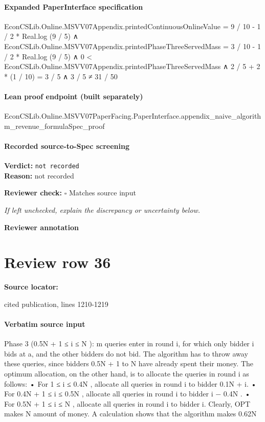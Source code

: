 \documentclass[10pt]{article}
\newcommand{\reviewerbox}{%
  \par\noindent\fbox{\parbox{0.96\linewidth}{\rule{0pt}{0.38in}}}\par
}
\newcommand{\reviewmatch}[1]{%
  \par\noindent\textbf{Reviewer check:} $\square$\; #1\par
  \noindent\emph{If left unchecked, explain the discrepancy or uncertainty below.}\par
}
\begin{document}
\paragraph{Expanded PaperInterface specification}
\begin{ReviewVerbatim}
EconCSLib.Online.MSVV07Appendix.printedContinuousOnlineValue = 9 / 10 - 1 / 2 * Real.log (9 / 5) ∧
  EconCSLib.Online.MSVV07Appendix.printedPhaseThreeServedMass = 3 / 10 - 1 / 2 * Real.log (9 / 5) ∧
    0 < EconCSLib.Online.MSVV07Appendix.printedPhaseThreeServedMass ∧ 2 / 5 + 2 * (1 / 10) = 3 / 5 ∧ 3 / 5 ≠ 31 / 50
\end{ReviewVerbatim}

\paragraph{Lean proof endpoint (built separately)}\begin{ReviewVerbatim}
EconCSLib.Online.MSVV07PaperFacing.PaperInterface.appendix_naive_algorithm_revenue_formulaSpec_proof
\end{ReviewVerbatim}

\paragraph{Recorded source-to-Spec screening}
\textbf{Verdict:} \texttt{not recorded}
\\
\textbf{Reason:} not recorded
\reviewmatch{Matches source input}
\noindent\textbf{Reviewer annotation}\par
\reviewerbox
\clearpage
\hypertarget{source-claim-e47cbf2a2f0be718}{}
\section*{Review row 36}
\textbf{Source locator:} {\footnotesize\raggedright cited publication, lines 1210-\allowbreak{}1219\par}
\paragraph{Verbatim source input}
\begin{ReviewVerbatim}
Phase 3 (0.5N + 1 ≤ i ≤ N ): m queries enter in round i, for which only bidder i bids at a,
and the other bidders do not bid.
The algorithm has to throw away these queries, since bidders 0.5N + 1 to N have already spent
their money.
The optimum allocation, on the other hand, is to allocate the queries in round i as follows:
• For 1 ≤ i ≤ 0.4N , allocate all queries in round i to bidder 0.1N + i.
• For 0.4N + 1 ≤ i ≤ 0.5N , allocate all queries in round i to bidder i − 0.4N .
• For 0.5N + 1 ≤ i ≤ N , allocate all queries in round i to bidder i.
Clearly, OPT makes N amount of money. A calculation shows that the algorithm makes 0.62N
\end{ReviewVerbatim}
\end{document}

